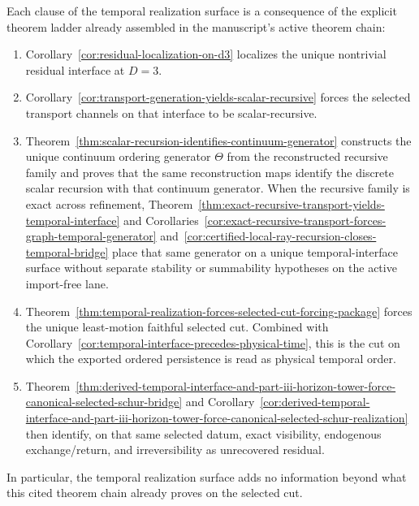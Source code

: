 \begin{proposition}
\label{prop:temporal-dissolution}
Each clause of the temporal realization surface is a consequence of the
explicit theorem ladder already assembled in the manuscript's active theorem
chain:
\begin{enumerate}[label=\textup{(\roman*)}, itemsep=0.2em]
\item Corollary~\ref{cor:residual-localization-on-d3} localizes the unique
      nontrivial residual interface at \(D=3\).
\item Corollary~\ref{cor:transport-generation-yields-scalar-recursive} forces
      the selected transport channels on that interface to be scalar-recursive.
\item Theorem~\ref{thm:scalar-recursion-identifies-continuum-generator}
      constructs the unique continuum ordering generator \(\Theta\) from the
      reconstructed recursive family and proves that the same reconstruction
      maps identify the discrete scalar recursion with that continuum
      generator. When the recursive family is exact across refinement,
      Theorem~\ref{thm:exact-recursive-transport-yields-temporal-interface}
      and Corollaries~\ref{cor:exact-recursive-transport-forces-graph-temporal-generator}
      and~\ref{cor:certified-local-ray-recursion-closes-temporal-bridge}
      place that same generator on a unique temporal-interface surface without
      separate stability or summability hypotheses on the active import-free
      lane.
\item Theorem~\ref{thm:temporal-realization-forces-selected-cut-forcing-package}
      forces the unique least-motion faithful selected cut. Combined with
      Corollary~\ref{cor:temporal-interface-precedes-physical-time}, this is
      the cut on which the exported ordered persistence is read as physical
      temporal order.
\item Theorem~\ref{thm:derived-temporal-interface-and-part-iii-horizon-tower-force-canonical-selected-schur-bridge}
      and
      Corollary~\ref{cor:derived-temporal-interface-and-part-iii-horizon-tower-force-canonical-selected-schur-realization}
      then identify, on that same selected datum, exact visibility,
      endogenous exchange/return, and irreversibility as unrecovered residual.
\end{enumerate}
In particular, the temporal realization surface adds no information beyond
what this cited theorem chain already proves on the selected cut.
\end{proposition}

